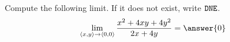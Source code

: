 \documentclass{ximera}
\author{Jim Talamo \and Bart Snapp}
\begin{document}
\begin{exercise}
  Compute the following limit. If it does not exist, write $\verb|DNE|$.
  \[
  \lim_{\vector{x,y}\to \vector{0,0}}\frac{x^2+4xy+4y^2}{2x+4y} = \answer{0}
  \]
\end{exercise}
\end{document}
